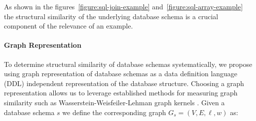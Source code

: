As shown in the figures~\ref{figure:sql-join-example} and~\ref{figure:sql-array-example}
the structural similarity of the underlying database schema is a crucial component
of the relevance of an example.

\paragraph{Graph Representation}

To determine structural similarity of database schemas systematically, we propose
using graph representation of database schemas as a data definition language (DDL)
independent representation of the database structure. Choosing a graph
representation allows us to leverage established methods for measuring graph similarity
such as Wasserstein-Weisfeiler-Lehman graph kernels \citep{WWL}. 
Given a database schema $s$ we define the corresponding graph $G_s = (V, E, \ell, w)$ as:

